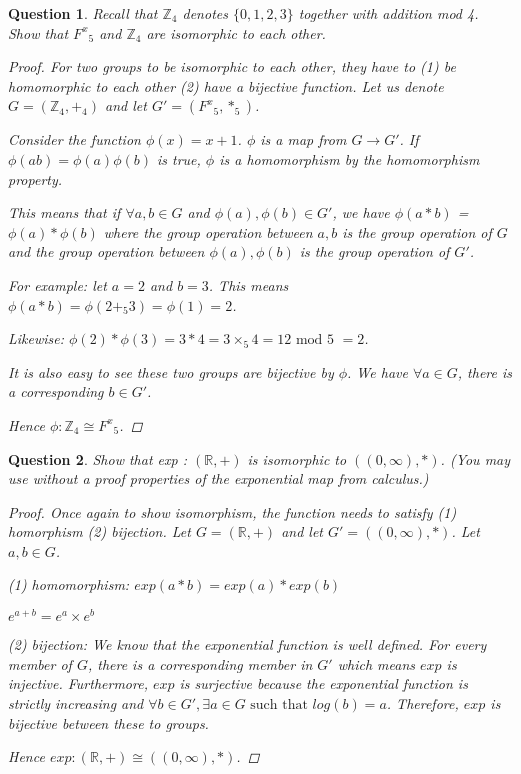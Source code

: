 \documentclass{article}
\newcommand*{\field}[1]{\mathbb{#1}}%
\newtheorem{ques}{Question}
\begin{document}
\begin{ques} 
	Recall that $\field{Z}_4$ denotes $\{0, 1, 2, 3\}$ together with addition mod 4. Show that ${F^x}_5$ and $\field{Z}_4$ are isomorphic to each other.
\begin{proof}

	For two groups to be isomorphic to each other, they have to (1) be homomorphic to each other (2) have a bijective function. Let us denote $G =  (\field{Z}_4, +_4)$ and let $G' = ({F^x}_5, *_5)$.
		
	Consider the function $\phi(x) = x + 1$. $\phi$ is a map from $G \rightarrow G'$. If $\phi(ab) = \phi(a)\phi(b)$ is true, $\phi$ is a homomorphism by the homomorphism property.
	
	This means that if $\forall a,b \in G$ and $\phi(a), \phi(b) \in G'$, we have $\phi(a*b)$ = $\phi(a) * \phi(b)$ where the group operation between $a,b$ is the group operation of $G$ and the group operation between $\phi(a), \phi(b)$ is the group operation of $G'$.
	
	For example: let $a = 2$ and $b = 3$. This means $\phi(a*b) = \phi(2 +_5 3) = \phi(1) = 2$.
	
	Likewise: $\phi(2) * \phi(3) = 3 * 4 = 3 \times_5 4 = 12 \text{ mod 5 } = 2$.
	
	It is also easy to see these two groups are bijective by $\phi$. We have $\forall a \in G$, there is a corresponding $b \in  G'$.

	Hence $\phi : \field{Z}_4 \cong {F^x}_5$.  
\end{proof}
\end{ques}

\begin{ques} 
	Show that exp : $(\field{R}, +)$ is isomorphic to $((0, \infty), *)$. (You may use without a proof properties of the exponential map from calculus.)
\begin{proof}
	Once again to show isomorphism, the function needs to satisfy (1) homorphism (2) bijection. Let $G = (\field{R}, +)$ and let $G' = ((0, \infty), *)$. Let $a,b \in G$.
	
	(1) homomorphism: $exp(a*b) = exp(a)*exp(b)$
	
	$e^{a+b} = e^a \times e^b$
	
	(2) bijection: We know that the exponential function is well defined. For every member of $G$, there is a corresponding member in $G'$ which means $exp$ is injective. Furthermore, $exp$ is surjective because the exponential function is strictly increasing and $\forall b \in G', \exists a \in G \text{ such that } log(b) = a$. Therefore, $exp$ is bijective between these to groups.
	
		Hence $exp : (\field{R}, +) \cong ((0, \infty), *)$.
\end{proof}	
\end{ques}
\end{document}
